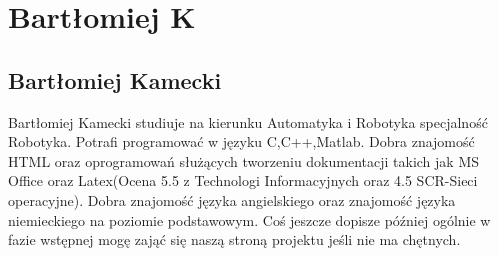 \section{Bartłomiej K}
\subsection{Bartłomiej Kamecki}
Bartłomiej Kamecki studiuje na kierunku Automatyka i Robotyka specjalność Robotyka. Potrafi programować w języku C,C++,Matlab. Dobra znajomość HTML oraz oprogramowań służących tworzeniu dokumentacji takich jak MS Office oraz Latex(Ocena 5.5 z Technologi Informacyjnych oraz 4.5 SCR-Sieci operacyjne). Dobra znajomość języka angielskiego oraz znajomość języka niemieckiego na poziomie podstawowym. Coś jeszcze dopisze później ogólnie w fazie wstępnej mogę zająć się naszą stroną projektu jeśli nie ma chętnych.
